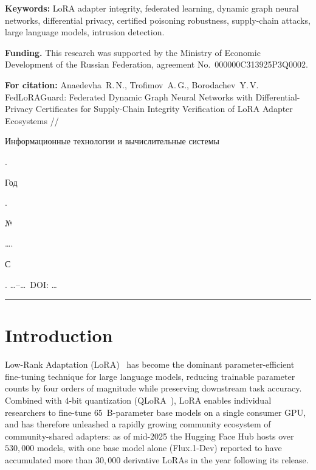 \documentclass[12pt,a4paper]{article}
\newcommand{\ru}[1]{\begin{otherlanguage}{russian}#1\end{otherlanguage}}
\theoremstyle{definition}
\theoremstyle{remark}
\newcommand{\modelname}{FedLoRAGuard}
\begin{document}
\noindent\textbf{Keywords:} LoRA adapter integrity, federated learning, dynamic graph neural networks, differential privacy, certified poisoning robustness, supply-chain attacks, large language models, intrusion detection.

\vspace{0.4em}

\noindent\textbf{Funding.} This research was supported by the Ministry of Economic Development of the Russian Federation, agreement No.~000000C313925P3Q0002.

\vspace{0.4em}

\noindent\textbf{For citation:} Anaedevha~R.\,N., Trofimov~A.\,G., Borodachev~Y.\,V. \modelname{}: Federated Dynamic Graph Neural Networks with Differential-Privacy Certificates for Supply-Chain Integrity Verification of LoRA Adapter Ecosystems // \ru{Информационные технологии и вычислительные системы}. \ru{Год}. \ru{№} \ldots. \ru{С}. \ldots--\ldots\ DOI: \ldots

\vspace{1.0em}
\hrule
\vspace{0.6em}

\section{Introduction}
\label{sec:introduction}


Low-Rank Adaptation (LoRA)~\cite{hu2021lora} has become the dominant parameter-efficient fine-tuning technique for large language models, reducing trainable parameter counts by four orders of magnitude while preserving downstream task accuracy. Combined with $4$-bit quantization (QLoRA~\cite{dettmers2023qlora}), LoRA enables individual researchers to fine-tune $65$~B-parameter base models on a single consumer GPU, and has therefore unleashed a rapidly growing community ecosystem of community-shared adapters: as of mid-2025 the Hugging Face Hub hosts over $530{,}000$ models, with one base model alone (Flux.1-Dev) reported to have accumulated more than $30{,}000$ derivative LoRAs in the year following its release.
\end{document}
